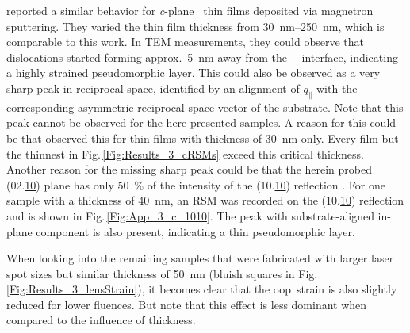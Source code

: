 \textcite{makushko2022} reported a similar behavior for \textit{c}-plane \cro\ thin films deposited via magnetron sputtering.
They varied the thin film thickness from \qtyrange{30}{250}{\nm}, which is comparable to this work.
In \gls{TEM} measurements, they could observe that dislocations started forming approx.\ \qty{5}{\nm} away from the \cro--\alo\ interface, indicating a highly strained pseudomorphic layer.
This could also be observed as a very sharp peak in reciprocal space, identified by an alignment of $q_\parallel$ with the  corresponding asymmetric reciprocal space vector of the substrate.
Note that this peak cannot be observed for the here presented samples.
A reason for this could be that \citeauthor{makushko2022} observed this for thin films with thickness of \qty{30}{\nm} only.
Every film but the thinnest in Fig.\,\ref{Fig:Results_3_cRSMs} exceed this critical thickness.
Another reason for the missing sharp peak could be that the herein probed (02.\underline{10}) plane has only \qty{50}{\percent} of the intensity of the (10.\underline{10}) reflection
    \cite[mp-19399]{MaterialsProject}.
For one sample with a thickness of \qty{40}{\nm}, an \acrshort{RSM} was recorded on the (10.\underline{10}) reflection and is shown in Fig.\,\ref{Fig:App_3_c_1010}.
The peak with substrate-aligned in-plane component is also present, indicating a thin pseudomorphic layer.

When looking into the remaining samples that were fabricated with larger laser spot sizes but similar thickness of \qty{50}{\nm} (bluish squares in Fig.\,\ref{Fig:Results_3_lensStrain}), it becomes clear that the \gls{oop}\ strain is also slightly reduced for lower fluences.
But note that this effect is less dominant when compared to the influence of thickness.

